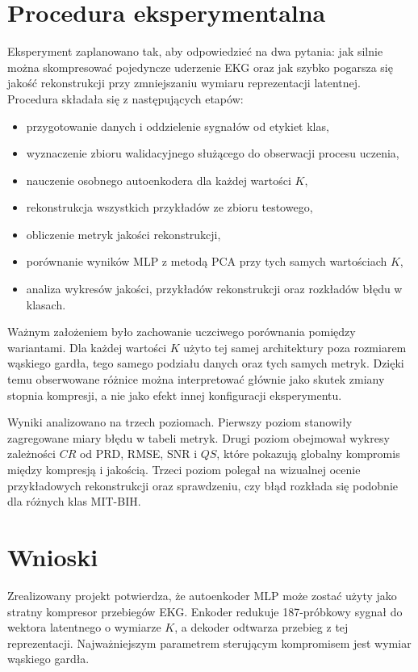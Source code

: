 \documentclass[12pt,a4paper]{article}
\begin{document}
\section{Procedura eksperymentalna}
Eksperyment zaplanowano tak, aby odpowiedzieć na dwa pytania: jak silnie można skompresować pojedyncze uderzenie EKG oraz jak szybko pogarsza się jakość rekonstrukcji przy zmniejszaniu wymiaru reprezentacji latentnej. Procedura składała się z następujących etapów:
\begin{itemize}
    \item przygotowanie danych i oddzielenie sygnałów od etykiet klas,
    \item wyznaczenie zbioru walidacyjnego służącego do obserwacji procesu uczenia,
    \item nauczenie osobnego autoenkodera dla każdej wartości $K$,
    \item rekonstrukcja wszystkich przykładów ze zbioru testowego,
    \item obliczenie metryk jakości rekonstrukcji,
    \item porównanie wyników MLP z metodą PCA przy tych samych wartościach $K$,
    \item analiza wykresów jakości, przykładów rekonstrukcji oraz rozkładów błędu w klasach.
\end{itemize}

Ważnym założeniem było zachowanie uczciwego porównania pomiędzy wariantami. Dla każdej wartości $K$ użyto tej samej architektury poza rozmiarem wąskiego gardła, tego samego podziału danych oraz tych samych metryk. Dzięki temu obserwowane różnice można interpretować głównie jako skutek zmiany stopnia kompresji, a nie jako efekt innej konfiguracji eksperymentu.

Wyniki analizowano na trzech poziomach. Pierwszy poziom stanowiły zagregowane miary błędu w tabeli metryk. Drugi poziom obejmował wykresy zależności $CR$ od PRD, RMSE, SNR i $QS$, które pokazują globalny kompromis między kompresją i jakością. Trzeci poziom polegał na wizualnej ocenie przykładowych rekonstrukcji oraz sprawdzeniu, czy błąd rozkłada się podobnie dla różnych klas MIT-BIH.

\section{Wnioski}
Zrealizowany projekt potwierdza, że autoenkoder MLP może zostać użyty jako stratny kompresor przebiegów EKG. Enkoder redukuje 187-próbkowy sygnał do wektora latentnego o wymiarze $K$, a dekoder odtwarza przebieg z tej reprezentacji. Najważniejszym parametrem sterującym kompromisem jest wymiar wąskiego gardła.
\end{document}
